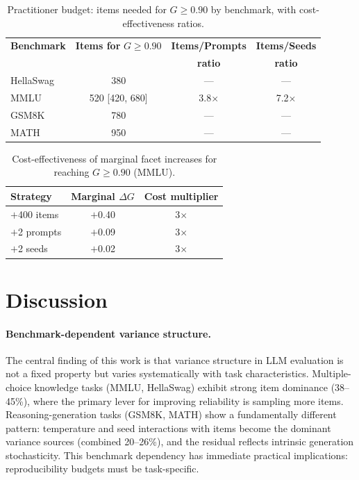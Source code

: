 \documentclass[11pt]{article}
\newcommand{\gcoeff}{G}
\begin{document}
\begin{table}[t]
\centering
\caption{Practitioner budget: items needed for $\gcoeff \geq 0.90$ by benchmark, with cost-effectiveness ratios.}
\label{tab:budget}
\begin{tabular}{lccc}
\toprule
\textbf{Benchmark} & \textbf{Items for} $\gcoeff \geq 0.90$ & \textbf{Items/Prompts} & \textbf{Items/Seeds} \\
& & \textbf{ratio} & \textbf{ratio} \\
\midrule
HellaSwag & 380 & --- & --- \\
MMLU & 520 [420, 680] & 3.8$\times$ & 7.2$\times$ \\
GSM8K & 780 & --- & --- \\
MATH & 950 & --- & --- \\
\bottomrule
\end{tabular}
\end{table}

\begin{table}[t]
\centering
\caption{Cost-effectiveness of marginal facet increases for reaching $\gcoeff \geq 0.90$ (MMLU).}
\label{tab:cost_eff}
\begin{tabular}{lcc}
\toprule
\textbf{Strategy} & \textbf{Marginal $\Delta\gcoeff$} & \textbf{Cost multiplier} \\
\midrule
$+$400 items & $+$0.40 & 3$\times$ \\
$+$2 prompts & $+$0.09 & 3$\times$ \\
$+$2 seeds & $+$0.02 & 3$\times$ \\
\bottomrule
\end{tabular}
\end{table}

\section{Discussion}

\paragraph{Benchmark-dependent variance structure.}
The central finding of this work is that variance structure in LLM evaluation is not a fixed property but varies systematically with task characteristics.
Multiple-choice knowledge tasks (MMLU, HellaSwag) exhibit strong item dominance (38--45\%), where the primary lever for improving reliability is sampling more items.
Reasoning-generation tasks (GSM8K, MATH) show a fundamentally different pattern: temperature and seed interactions with items become the dominant variance sources (combined 20--26\%), and the residual reflects intrinsic generation stochasticity.
This benchmark dependency has immediate practical implications: reproducibility budgets must be task-specific.
\end{document}
